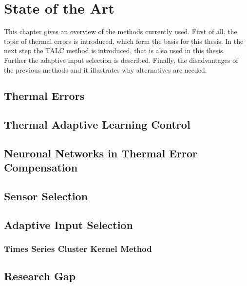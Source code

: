 \chapter{State of the Art}
\label{chp:stateoftheart}

This chapter gives an overview of the methods currently used. First of all, the topic of thermal errors is introduced, which form the basis for this thesis. In the next step the TALC method is introduced, that is also used in this thesis. Further the adaptive input selection is described. Finally, the disadvantages of the previous methods and it illustrates why alternatives are needed.

\section{Thermal Errors}
\label{sec:thermalerrors}






\section{Thermal Adaptive Learning Control}
\label{sec:TALC}

\section{Neuronal Networks in Thermal Error Compensation}
\label{sec:neuronal_networks}


\section{Sensor Selection}
\label{sec:sensor_selectiom}




\section{Adaptive Input Selection}
\label{sec:Adaptiveinputselection}




\subsection{Times Series Cluster Kernel Method}
\label{sec:introTCK}





\section{Research Gap}
\label{sec:researchgap}



